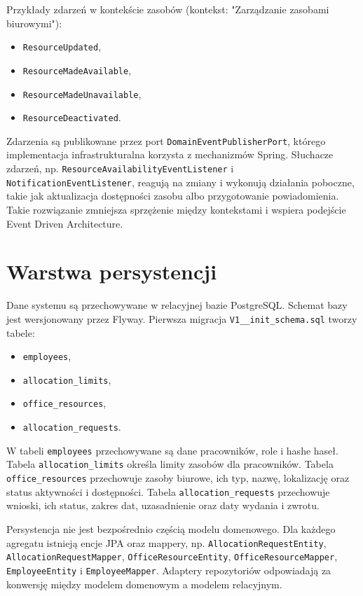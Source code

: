 Przykłady zdarzeń w kontekście zasobów (kontekst: "Zarządzanie zasobami biurowymi"):
\begin{itemize}
    \item \texttt{ResourceUpdated},
    \item \texttt{ResourceMadeAvailable},
    \item \texttt{ResourceMadeUnavailable},
    \item \texttt{ResourceDeactivated}.
\end{itemize}

Zdarzenia są publikowane przez port \texttt{DomainEventPublisherPort}, którego implementacja infrastrukturalna korzysta z mechanizmów Spring. Słuchacze zdarzeń, np. \texttt{ResourceAvailabilityEventListener} i \texttt{NotificationEventListener}, reagują na zmiany i wykonują działania poboczne, takie jak aktualizacja dostępności zasobu albo przygotowanie powiadomienia. Takie rozwiązanie zmniejsza sprzężenie między kontekstami i wspiera podejście Event Driven Architecture.

\section{Warstwa persystencji}

Dane systemu są przechowywane w relacyjnej bazie PostgreSQL. Schemat bazy jest wersjonowany przez Flyway. Pierwsza migracja \texttt{V1\_\_init\_schema.sql} tworzy tabele:
\begin{itemize}
    \item \texttt{employees},
    \item \texttt{allocation\_limits},
    \item \texttt{office\_resources},
    \item \texttt{allocation\_requests}.
\end{itemize}

W tabeli \texttt{employees} przechowywane są dane pracowników, role i hashe haseł. Tabela \texttt{allocation\_limits} określa limity zasobów dla pracowników. Tabela \texttt{office\_resources} przechowuje zasoby biurowe, ich typ, nazwę, lokalizację oraz status aktywności i dostępności. Tabela \texttt{allocation\_requests} przechowuje wnioski, ich status, zakres dat, uzasadnienie oraz daty wydania i zwrotu.

Persystencja nie jest bezpośrednio częścią modelu domenowego. Dla każdego agregatu istnieją encje JPA oraz mappery, np. \texttt{AllocationRequestEntity}, \texttt{AllocationRequestMapper}, \texttt{OfficeResourceEntity}, \texttt{OfficeResourceMapper}, \texttt{EmployeeEntity} i \texttt{EmployeeMapper}. Adaptery repozytoriów odpowiadają za konwersję między modelem domenowym a modelem relacyjnym.

